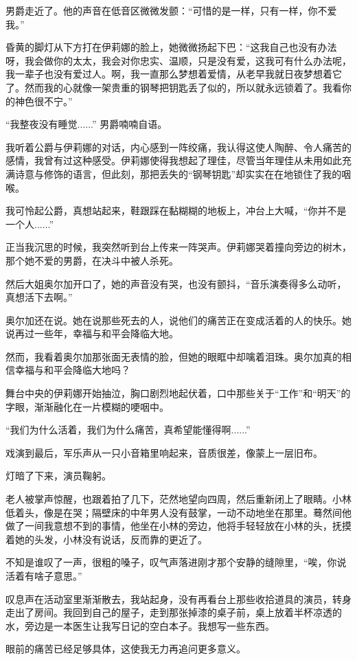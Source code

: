 男爵走近了。他的声音在低音区微微发颤：“可惜的是一样，只有一样，你不爱我。”

昏黄的脚灯从下方打在伊莉娜的脸上，她微微扬起下巴：“这我自己也没有办法呀，我会做你的太太，我会对你忠实、温顺，只是没有爱，这我可有什么办法呢，我一辈子也没有爱过人。啊，我一直那么梦想着爱情，从老早我就日夜梦想着它了。然而我的心就像一架贵重的钢琴把钥匙丢了似的，所以就永远锁着了。我看你的神色很不宁。”

“我整夜没有睡觉......” 男爵喃喃自语。

我听着公爵与伊莉娜的对话，内心感到一阵绞痛，我认得这使人陶醉、令人痛苦的感情，我曾有过这种感受。伊莉娜使得我想起了理佳，尽管当年理佳从未用如此充满诗意与修饰的语言，但此刻，那把丢失的“钢琴钥匙”却实实在在地锁住了我的咽喉。

我可怜起公爵，真想站起来，鞋跟踩在黏糊糊的地板上，冲台上大喊，“你并不是一个人......”

正当我沉思的时候，我突然听到台上传来一阵哭声。伊莉娜哭着撞向旁边的树木，那个她不爱的男爵，在决斗中被人杀死。

然后大姐奥尔加开口了，她的声音没有哭，也没有颤抖，“音乐演奏得多么动听，真想活下去啊。”

奥尔加还在说。她在说那些死去的人，说他们的痛苦正在变成活着的人的快乐。她说再过一些年，幸福与和平会降临大地。

然而，我看着奥尔加那张面无表情的脸，但她的眼眶中却噙着泪珠。奥尔加真的相信幸福与和平会降临大地吗？

舞台中央的伊莉娜开始抽泣，胸口剧烈地起伏着，口中那些关于“工作”和“明天”的字眼，渐渐融化在一片模糊的哽咽中。

“我们为什么活着，我们为什么痛苦，真希望能懂得啊......”

戏演到最后，军乐声从一只小音箱里响起来，音质很差，像蒙上一层旧布。

灯暗了下来，演员鞠躬。

老人被掌声惊醒，也跟着拍了几下，茫然地望向四周，然后重新闭上了眼睛。小林低着头，像是在哭；隔壁床的中年男人没有鼓掌，一动不动地坐在那里。蓦然间他做了一间我意想不到的事情，他坐在小林的旁边，他将手轻轻放在小林的头，抚摸着她的头发，小林没有说话，反而靠的更近了。

不知是谁叹了一声，很粗的嗓子，叹气声落进刚才那个安静的缝隙里，“唉，你说活着有啥子意思。”

叹息声在活动室里渐渐散去，我站起身，没有再看台上那些收拾道具的演员，转身走出了房间。我回到自己的屋子，走到那张掉漆的桌子前，桌上放着半杯凉透的水，旁边是一本医生让我写日记的空白本子。我想写一些东西。

眼前的痛苦已经足够具体，这使我无力再追问更多意义。
